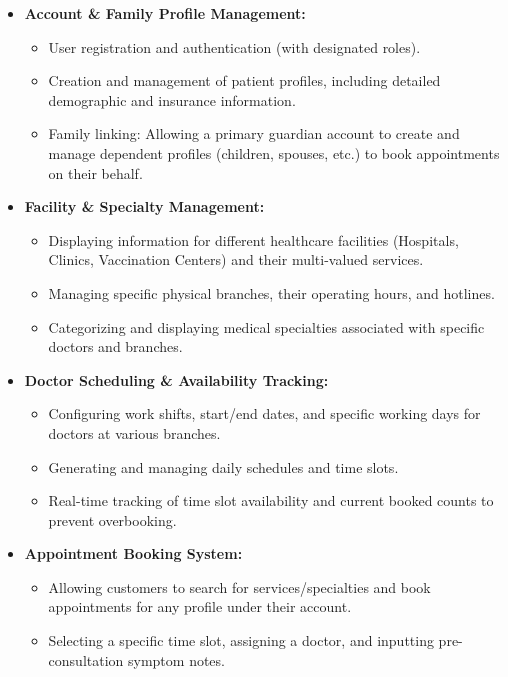 \begin{itemize}
    \item \textbf{Account \& Family Profile Management:}
    \begin{itemize}
        \item User registration and authentication (with designated roles).
        \item Creation and management of patient profiles, including detailed demographic and insurance information.
        \item Family linking: Allowing a primary guardian account to create and manage dependent profiles (children, spouses, etc.) to book appointments on their behalf.
    \end{itemize}

    \item \textbf{Facility \& Specialty Management:}
    \begin{itemize}
        \item Displaying information for different healthcare facilities (Hospitals, Clinics, Vaccination Centers) and their multi-valued services.
        \item Managing specific physical branches, their operating hours, and hotlines.
        \item Categorizing and displaying medical specialties associated with specific doctors and branches.
    \end{itemize}

    \item \textbf{Doctor Scheduling \& Availability Tracking:}
    \begin{itemize}
        \item Configuring work shifts, start/end dates, and specific working days for doctors at various branches.
        \item Generating and managing daily schedules and time slots.
        \item Real-time tracking of time slot availability and current booked counts to prevent overbooking.
    \end{itemize}

    \item \textbf{Appointment Booking System:}
    \begin{itemize}
        \item Allowing customers to search for services/specialties and book appointments for any profile under their account.
        \item Selecting a specific time slot, assigning a doctor, and inputting pre-consultation symptom notes.
    \end{itemize}


\end{itemize}
